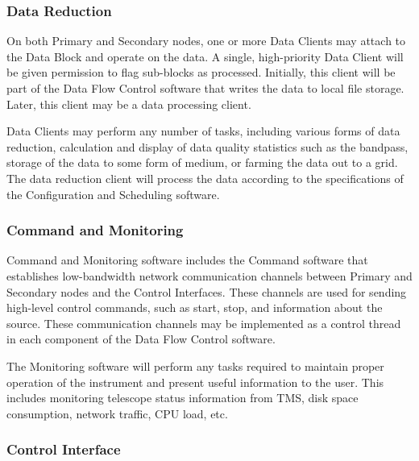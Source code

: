 \subsubsection{Data Reduction}

On both Primary and Secondary nodes, one or more Data Clients may
attach to the Data Block and operate on the data.  A single,
high-priority Data Client will be given permission to flag sub-blocks
as processed.  Initially, this client will be part of the Data Flow
Control software that writes the data to local file storage.  Later,
this client may be a data processing client.  

Data Clients may perform any number of tasks, including various forms
of data reduction, calculation and display of data quality statistics
such as the bandpass, storage of the data to some form of medium, or
farming the data out to a grid.  The data reduction client will
process the data according to the specifications of the Configuration
and Scheduling software.

\subsubsection{Command and Monitoring}

Command and Monitoring software includes the Command software that
establishes low-bandwidth network communication channels between
Primary and Secondary nodes and the Control Interfaces.  These
channels are used for sending high-level control commands, such as
start, stop, and information about the source.  These communication
channels may be implemented as a control thread in each component of
the Data Flow Control software. 

The Monitoring software will perform any tasks required to maintain
proper operation of the instrument and present useful information to
the user.  This includes monitoring telescope status information from
TMS, disk space consumption, network traffic, CPU load, etc.

\subsubsection{Control Interface}

